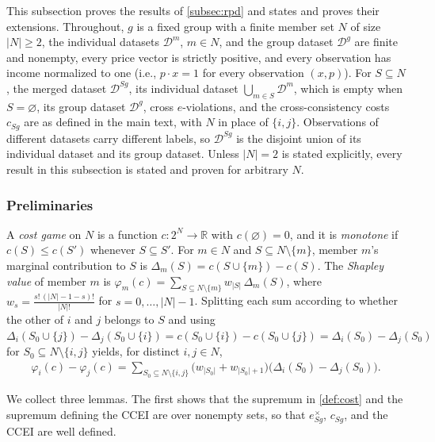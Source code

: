 \documentclass[11 pt]{article}
\begin{document}
This subsection proves the results of \autoref{subsec:rpd} and states and proves their extensions. Throughout, $g$ is a fixed group with a finite member set $N$ of size $|N| \geq 2$, the individual datasets $\mathcal{D}^{m}$, $m \in N$, and the group dataset $\mathcal{D}^{g}$ are finite and nonempty, every price vector is strictly positive, and every observation has income normalized to one (i.e., $p \cdot x = 1$ for every observation $(x,p)$). For $S \subseteq N$, the merged dataset $\mathcal{D}^{Sg}$, its individual dataset $\bigcup_{m \in S} \mathcal{D}^{m}$, which is empty when $S = \varnothing$, its group dataset $\mathcal{D}^{g}$, cross $e$-violations, and the cross-consistency costs $c_{Sg}$ are as defined in the main text, with $N$ in place of $\{i,j\}$. Observations of different datasets carry different labels, so $\mathcal{D}^{Sg}$ is the disjoint union of its individual dataset and its group dataset. Unless $|N| = 2$ is stated explicitly, every result in this subsection is stated and proven for arbitrary $N$.

\subsubsection{Preliminaries}\label{subsec:app_prelim}

A \emph{cost game} on $N$ is a function $c : 2^{N} \to \mathbb{R}$ with $c(\varnothing) = 0$, and it is \emph{monotone} if $c(S) \leq c(S')$ whenever $S \subseteq S'$. For $m \in N$ and $S \subseteq N \setminus \{m\}$, member $m$'s marginal contribution to $S$ is $\Delta_{m}(S) = c(S \cup \{m\}) - c(S)$. The \emph{Shapley value} of member $m$ is $\varphi_{m}(c) = \sum_{S \subseteq N \setminus \{m\}} w_{|S|}\, \Delta_{m}(S)$, where $w_{s} = \frac{s!\,(|N|-1-s)!}{|N|!}$ for $s = 0, \dots, |N|-1$. Splitting each sum according to whether the other of $i$ and $j$ belongs to $S$ and using $\Delta_{i}(S_0 \cup \{j\}) - \Delta_{j}(S_0 \cup \{i\}) = c(S_0 \cup \{i\}) - c(S_0 \cup \{j\}) = \Delta_{i}(S_0) - \Delta_{j}(S_0)$ for $S_0 \subseteq N \setminus \{i,j\}$ yields, for distinct $i, j \in N$,
\begin{align}\label{eqn:app_phi_diff}
\varphi_{i}(c) - \varphi_{j}(c) = \sum_{S_0 \subseteq N \setminus \{i,j\}} \bigl( w_{|S_0|} + w_{|S_0|+1} \bigr) \bigl( \Delta_{i}(S_0) - \Delta_{j}(S_0) \bigr).
\end{align}

We collect three lemmas. The first shows that the supremum in \autoref{def:cost} and the supremum defining the CCEI are over nonempty sets, so that $e^{\times}_{Sg}$, $c_{Sg}$, and the CCEI are well defined.
\end{document}
